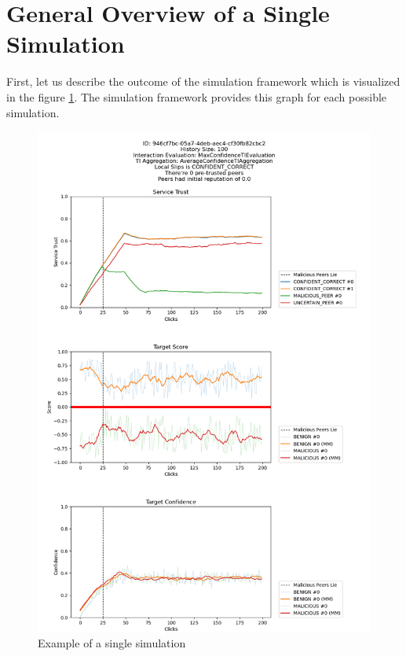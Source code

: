 \section{General Overview of a Single Simulation}
\label{sec:general-overview-of-simulation-output}
First, let us describe the outcome of the simulation framework which is visualized in the figure \ref{fig:single-simulation-example}.
The simulation framework provides this graph for each possible simulation.

\begin{figure}
    \centering
    \includegraphics[width=1.0\textwidth]{assets/example_evaluation.png}
    \caption{Example of a single simulation}
    \label{fig:single-simulation-example}
\end{figure}

